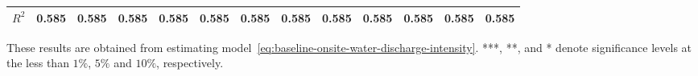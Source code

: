\begin{table}[H]
{\begin{tabular}{@{}lllllllllllll@{}}
            $R^2$                                         & 0.585     & 0.585     & 0.585     & 0.585     & 0.585     & 0.585     & 0.585                & 0.585                & 0.585                & 0.585             & 0.585             & 0.585             \\ \bottomrule \bottomrule
        \end{tabular}%
    }
    \begin{minipage}{18cm}
        \vspace{0.05in}
        These results are obtained from estimating model~\ref{eq:baseline-onsite-water-discharge-intensity}. ***, **, and * denote significance levels at the less than $1\%$, $5\%$ and $10\%$, respectively.
    \end{minipage}
\end{table}